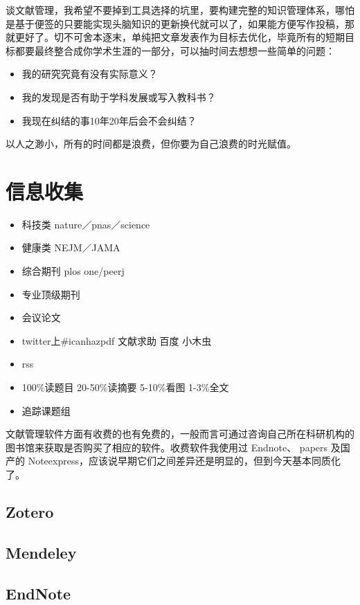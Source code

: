\documentclass[]{book}
\providecommand{\tightlist}{%
  \setlength{\itemsep}{0pt}\setlength{\parskip}{0pt}}
\begin{document}
谈文献管理，我希望不要掉到工具选择的坑里，要构建完整的知识管理体系，哪怕是基于便签的只要能实现头脑知识的更新换代就可以了，如果能方便写作投稿，那就更好了。切不可舍本逐末，单纯把文章发表作为目标去优化，毕竟所有的短期目标都要最终整合成你学术生涯的一部分，可以抽时间去想想一些简单的问题：

\begin{itemize}
\tightlist
\item
  我的研究究竟有没有实际意义？
\item
  我的发现是否有助于学科发展或写入教科书？
\item
  我现在纠结的事10年20年后会不会纠结？
\end{itemize}

以人之渺小，所有的时间都是浪费，但你要为自己浪费的时光赋值。

\section{信息收集}

\begin{itemize}
\tightlist
\item
  科技类 nature／pnas／science
\item
  健康类 NEJM／JAMA
\item
  综合期刊 plos one/peerj
\item
  专业顶级期刊
\item
  会议论文
\item
  twitter上\#icanhazpdf 文献求助 百度 小木虫
\item
  rss
\item
  100\%读题目 20-50\%读摘要 5-10\%看图 1-3\%全文
\item
  追踪课题组
\end{itemize}

文献管理软件方面有收费的也有免费的，一般而言可通过咨询自己所在科研机构的图书馆来获取是否购买了相应的软件。收费软件我使用过
Endnote、 papers 及国产的
Noteexpress，应该说早期它们之间差异还是明显的，但到今天基本同质化了。

\subsection{Zotero}\label{zotero}

\subsection{Mendeley}\label{mendeley}

\subsection{EndNote}\label{endnote}
\end{document}
